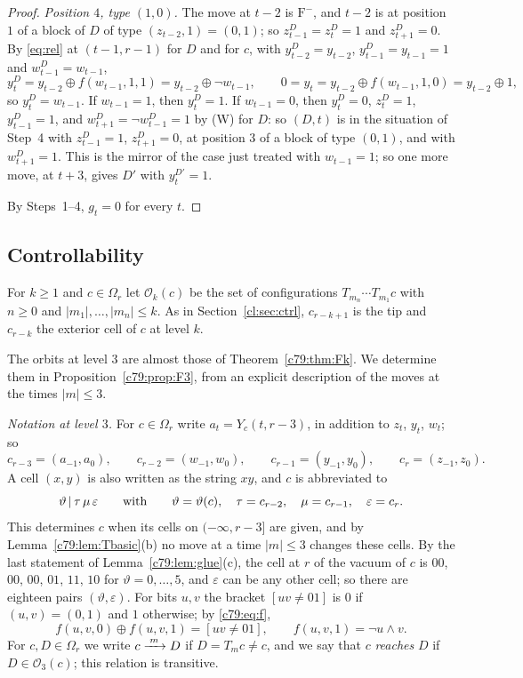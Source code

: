 \begin{proof}
\emph{Position $4$, type $(1,0)$.} The move at $t-2$ is $\mathrm F^-$, and $t-2$ is at position $1$ of a block of $D$ of type $(z_{t-2},1)=(0,1)$; so $z^D_{t-1}=z^D_t=1$ and $z^D_{t+1}=0$. By \eqref{eq:rel} at $(t-1,r-1)$ for $D$ and for $c$, with $y^D_{t-2}=y_{t-2}$, $y^D_{t-1}=y_{t-1}=1$ and $w^D_{t-1}=w_{t-1}$,
\[
y^D_t=y_{t-2}\oplus f(w_{t-1},1,1)=y_{t-2}\oplus\neg w_{t-1},\qquad 0=y_t=y_{t-2}\oplus f(w_{t-1},1,0)=y_{t-2}\oplus1,
\]
so $y^D_t=w_{t-1}$. If $w_{t-1}=1$, then $y^D_t=1$. If $w_{t-1}=0$, then $y^D_t=0$, $z^D_t=1$, $y^D_{t-1}=1$, and $w^D_{t+1}=\neg w^D_{t-1}=1$ by (W) for $D$: so $(D,t)$ is in the situation of Step~4 with $z^D_{t-1}=1$, $z^D_{t+1}=0$, at position $3$ of a block of type $(0,1)$, and with $w^D_{t+1}=1$. This is the mirror of the case just treated with $w_{t-1}=1$; so one more move, at $t+3$, gives $D'$ with $y^{D'}_t=1$.

By Steps~1--4, $g_t=0$ for every $t$.
\end{proof}


\subsection{Controllability}\label{c79:sec:Fk}

For $k\ge1$ and $c\in\Omega_r$ let $\mathcal O_k(c)$ be the set of configurations $T_{m_n}\cdots T_{m_1}c$ with $n\ge0$ and $|m_1|,\dots,|m_n|\le k$. As in Section~\ref{cl:sec:ctrl}, $c_{r-k+1}$ is the tip and $c_{r-k}$ the exterior cell of $c$ at level $k$.

The orbits at level $3$ are almost those of Theorem~\ref{c79:thm:Fk}. We determine them in Proposition~\ref{c79:prop:F3}, from an explicit description of the moves at the times $|m|\le3$.

\emph{Notation at level $3$.} For $c\in\Omega_r$ write $a_t=Y_c(t,r-3)$, in addition to $z_t$, $y_t$, $w_t$; so
\[
c_{r-3}=(a_{-1},a_0),\qquad c_{r-2}=(w_{-1},w_0),\qquad c_{r-1}=(y_{-1},y_0),\qquad c_r=(z_{-1},z_0).
\]
A cell $(x,y)$ is also written as the string $xy$, and $c$ is abbreviated to
\[
\vartheta\,|\,\tau\,\mu\,\varepsilon\qquad\text{with}\qquad\vartheta=\vartheta(c),\quad\tau=c_{r-2},\quad\mu=c_{r-1},\quad\varepsilon=c_r.
\]
This determines $c$ when its cells on $(-\infty,r-3]$ are given, and by Lemma~\ref{c79:lem:Tbasic}(b) no move at a time $|m|\le3$ changes these cells. By the last statement of Lemma~\ref{c79:lem:glue}(c), the cell at $r$ of the vacuum of $c$ is $00$, $00$, $00$, $01$, $11$, $10$ for $\vartheta=0,\dots,5$, and $\varepsilon$ can be any other cell; so there are eighteen pairs $(\vartheta,\varepsilon)$. For bits $u,v$ the bracket $[uv\ne01]$ is $0$ if $(u,v)=(0,1)$ and $1$ otherwise; by \eqref{c79:eq:f},
\begin{equation}\label{c79:eq:br}
f(u,v,0)\oplus f(u,v,1)=[uv\ne01],\qquad f(u,v,1)=\neg u\wedge v .
\end{equation}
For $c,D\in\Omega_r$ we write $c\xrightarrow{\;m\;}D$ if $D=T_mc\ne c$, and we say that $c$ \emph{reaches} $D$ if $D\in\mathcal O_3(c)$; this relation is transitive.

